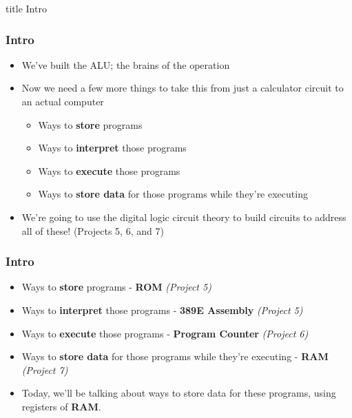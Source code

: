 \documentclass{beamer}
\begin{document}
    	\begin{frame}
                \vfill
                \centering
                \begin{beamercolorbox}[sep=8pt,center,shadow=true,rounded=true]{title}
                    Intro\par%
                \end{beamercolorbox}
                \vfill
             \end{frame}
    
    		\begin{frame}
    			\frametitle{Intro}
    			\begin{itemize}
    				\item We've built the ALU; the brains of the operation
    				\item Now we need a few more things to take this from just a calculator circuit to an actual computer
    				\begin{itemize}
    					\item Ways to \textbf{store} programs
    					\item Ways to \textbf{interpret} those programs
    					\item Ways to \textbf{execute} those programs
    					\item Ways to \textbf{store data} for those programs while they're executing
    				\end{itemize}
    				\item We're going to use the digital logic circuit theory to build circuits to address all of these! (Projects 5, 6, and 7)
    			\end{itemize}
    		\end{frame}
    		
    		\begin{frame}
    			\frametitle{Intro}
    			
    				\begin{itemize}
    					\item Ways to \textbf{store} programs - \textbf{ROM} \textit{(Project 5)}
    					\item Ways to \textbf{interpret} those programs - \textbf{389E Assembly} \textit{(Project 5)}
    					\item Ways to \textbf{execute} those programs - \textbf{Program Counter} \textit{(Project 6)}
    					\item Ways to \textbf{store data} for those programs while they're executing - \textbf{RAM} \textit{(Project 7)}
    					\item Today, we'll be talking about ways to store data for these programs, using registers of \textbf{RAM}.
    				\end{itemize}
    				
    			
    		\end{frame}
    		
    		
		
            
        
   	
\end{document}
